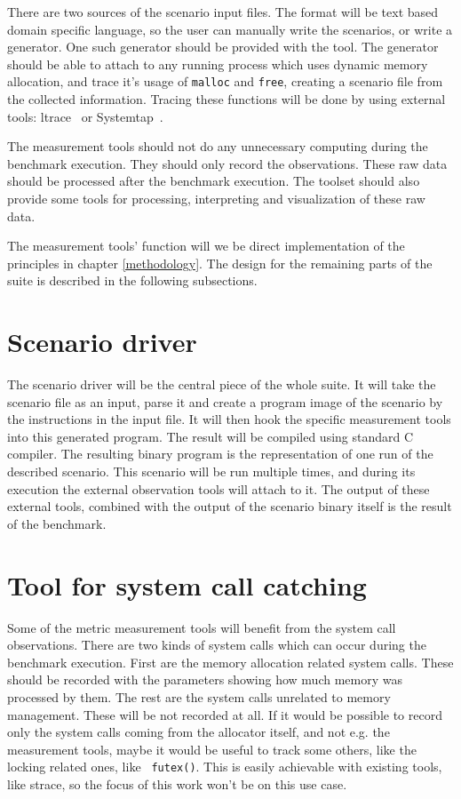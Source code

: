 There are two sources of the scenario input files. The format will be text based
domain specific language, so the user can manually write the scenarios, or write
a generator. One such generator should be provided with the tool. The generator
should be able to attach to any running process which uses dynamic memory
allocation, and trace it's usage of {\tt malloc} and {\tt free}, creating a
scenario file from the collected information. Tracing these functions will be
done by using external tools: ltrace~\cite{tools:ltrace} or Systemtap~\cite{tools:systemtap}.

The measurement tools should not do any unnecessary computing during the
benchmark execution. They should only record the observations. These raw data
should be processed after the benchmark execution. The toolset should also
provide some tools for processing, interpreting and visualization of these raw
data.

The measurement tools' function will we be direct implementation of the
principles in chapter \ref{methodology}. The design for the remaining parts of
the suite is described in the following subsections.

\section{Scenario driver}

The scenario driver will be the central piece of the whole suite. It will take
the scenario file as an input, parse it and create a program image of the
scenario by the instructions in the input file. It will then hook the specific
measurement tools into this generated program. The result will be compiled using
standard C compiler. The resulting binary program is the representation of one
run of the described scenario. This scenario will be run multiple times, and
during its execution the external observation tools will attach to it. The output
of these external tools, combined with the output of the scenario binary itself
is the result of the benchmark.

\section{Tool for system call catching}

Some of the metric measurement tools will benefit from the system call
observations. There are two kinds of system calls which can occur during the
benchmark execution. First are the memory allocation related system calls. These
should be recorded with the parameters showing how much memory was processed by
them. The rest are the system calls unrelated to memory management. These will be
not recorded at all. If it would be possible to record only the system calls
coming from the allocator itself, and not e.g. the measurement tools, maybe it
would be useful to track some others, like the locking related ones, like {\tt
futex()}. This is easily achievable with existing tools, like strace, so the
focus of this work won't be on this use case.

